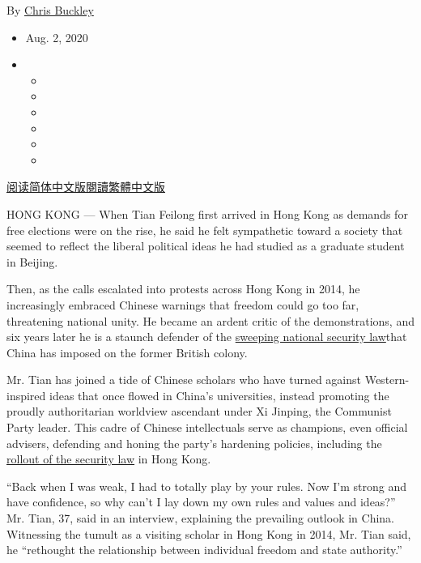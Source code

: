 By \href{https://www.nytimes3xbfgragh.onion/by/chris-buckley}{Chris
Buckley}

\begin{itemize}
\item
  Aug. 2, 2020
\item
  \begin{itemize}
  \item
  \item
  \item
  \item
  \item
  \item
  \end{itemize}
\end{itemize}

\href{https://cn.nytimes3xbfgragh.onion/china/20200803/china-hong-kong-national-security-law/}{阅读简体中文版}\href{https://cn.nytimes3xbfgragh.onion/china/20200803/china-hong-kong-national-security-law/zh-hant/}{閱讀繁體中文版}

HONG KONG --- When Tian Feilong first arrived in Hong Kong as demands
for free elections were on the rise, he said he felt sympathetic toward
a society that seemed to reflect the liberal political ideas he had
studied as a graduate student in Beijing.

Then, as the calls escalated into protests across Hong Kong in 2014, he
increasingly embraced Chinese warnings that freedom could go too far,
threatening national unity. He became an ardent critic of the
demonstrations, and six years later he is a staunch defender of the
\href{https://www.nytimes3xbfgragh.onion/2020/06/30/world/asia/china-critics-security-law-hong-kong.html}{sweeping
national security law}that China has imposed on the former British
colony.

Mr. Tian has joined a tide of Chinese scholars who have turned against
Western-inspired ideas that once flowed in China's universities, instead
promoting the proudly authoritarian worldview ascendant under Xi
Jinping, the Communist Party leader. This cadre of Chinese intellectuals
serve as champions, even official advisers, defending and honing the
party's hardening policies, including the
\href{https://www.nytimes3xbfgragh.onion/2020/07/01/world/asia/hong-kong-security-law-china.html}{rollout
of the security law} in Hong Kong.

``Back when I was weak, I had to totally play by your rules. Now I'm
strong and have confidence, so why can't I lay down my own rules and
values and ideas?'' Mr. Tian, 37, said in an interview, explaining the
prevailing outlook in China. Witnessing the tumult as a visiting scholar
in Hong Kong in 2014, Mr. Tian said, he ``rethought the relationship
between individual freedom and state authority.''

